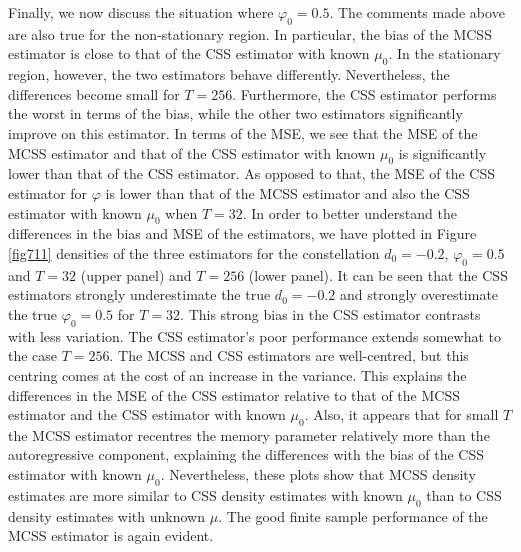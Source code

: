 {{Finally, we now discuss the situation where $\varphi_0 = 0.5$. The comments made above are also true for the non-stationary region. In particular, the bias of the MCSS estimator is close to that of the CSS estimator with known
$\mu_0$. In the stationary region, however, the two estimators behave differently. Nevertheless, the differences become small for $T = 256$. Furthermore, the CSS estimator performs the worst in terms of the bias, while the other
two estimators significantly improve on this estimator. In terms of the MSE, we see that the MSE of the MCSS estimator and that of the CSS estimator with known $\mu_0$ is significantly lower than that of the CSS estimator. As
opposed to that, the MSE of the CSS estimator for $\varphi$ is lower than that of the MCSS estimator and also the CSS estimator with known $\mu_0$ when $T = 32$. In order to better understand the differences in the bias and MSE of
the estimators, we have plotted in Figure \ref{fig711} densities of the three estimators for the constellation $d_0 = -0.2$, $\varphi_0 = 0.5$ and $T = 32$ (upper panel) and $T = 256$ (lower panel). It can be seen that the CSS
estimators strongly underestimate the true $d_0 = -0.2$ and strongly overestimate the true $\varphi_0 = 0.5$ for $T = 32$. This strong bias in the CSS estimator contrasts with less variation. The CSS estimator's poor performance
extends somewhat to the case $T = 256$. The MCSS and CSS estimators are well-centred, but this centring comes at the cost of an increase in the variance. This explains the differences in the MSE of the CSS estimator relative to
that of the MCSS estimator and the CSS estimator with known $\mu_0$. Also, it appears that for small $T$ the MCSS estimator recentres the memory parameter relatively more than the autoregressive component, explaining the
differences with the bias of the CSS estimator with known $\mu_0$. Nevertheless, these plots show that MCSS density estimates are more similar to CSS density estimates with known $\mu_0$ than to CSS density estimates with unknown
$\mu$. The good finite sample performance of the MCSS estimator is again evident.





}}
